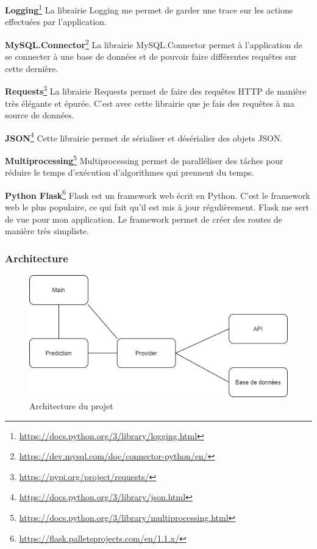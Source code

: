 \documentclass[a4paper,14pt]{extarticle}
\begin{document}
{\textbf{Logging}\footnote{\url{https://docs.python.org/3/library/logging.html}}
La librairie Logging me permet de garder une trace sur les actions effectuées par l'application. 

\textbf{MySQL.Connector}\footnote{\url{https://dev.mysql.com/doc/connector-python/en/}}
La librairie MySQL.Connector permet à l'application de se connecter à une base de données et de pouvoir faire différentes requêtes sur cette dernière. 

\textbf{Requests}\footnote{\url{https://pypi.org/project/requests/}}
La librairie Requests permet de faire des requêtes HTTP de manière très élégante et épurée. C'est avec cette librairie que je fais des requêtes à ma source de données. 

\textbf{JSON}\footnote{\url{https://docs.python.org/3/library/json.html}}
Cette librairie permet de sérialiser et désérialier des objets JSON. 

\textbf{Multiprocessing}\footnote{\url{https://docs.python.org/3/library/multiprocessing.html}}
Multiprocessing permet de paralléliser des tâches pour réduire le temps d'exécution d'algorithmes qui prennent du temps.

\textbf{Python Flask}\footnote{\url{https://flask.palletsprojects.com/en/1.1.x/}}
Flask est un framework web écrit en Python. C'est le framework web le plus populaire, ce qui fait qu'il est mis à jour régulièrement. Flask me sert de vue pour mon application. Le framework permet de créer des routes de manière très simpliste.

\subsubsection{Architecture}
\begin{figure}[htp]
    \centering
    \includegraphics[width=15cm]{../img/architectureClasse.png}
    \caption{Architecture du projet}
    \label{fig:architectureClasse}
\end{figure}

}
\end{document}
